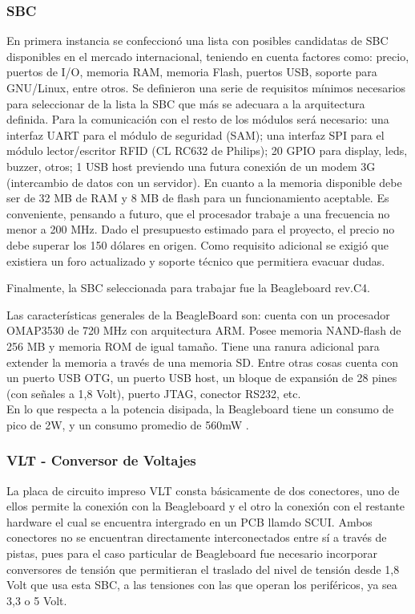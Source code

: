 \documentclass[%
        final,
        notitlepage,
        narroweqnarray,
        inline,
        ]{ieee}
\begin{document}
\subsubsection{SBC}
En primera instancia se confeccionó una lista con posibles candidatas de SBC disponibles
en el mercado internacional, teniendo en cuenta factores como: precio, puertos de I/O, memoria RAM, memoria Flash, puertos USB, soporte para GNU/Linux, entre otros.
Se definieron una serie de requisitos mínimos necesarios para seleccionar de la lista la SBC que más se adecuara a la arquitectura definida.
Para la comunicación con el resto de los módulos será necesario: una interfaz UART para el módulo de seguridad (SAM); una interfaz SPI para el módulo lector/escritor RFID (CL RC632 de Philips); 20 GPIO para display, leds, buzzer, otros; 1 USB host previendo una futura conexión de un modem 3G (intercambio de datos con un servidor). En cuanto a la memoria disponible debe ser de 32 MB de RAM y 8 MB de flash para un funcionamiento aceptable. Es conveniente, pensando a futuro, que el procesador trabaje a una frecuencia no menor a 200 MHz.
Dado el presupuesto estimado para el proyecto, el precio no debe superar los 150 dólares en origen.
Como requisito adicional se exigió que existiera un foro actualizado y soporte técnico que permitiera evacuar dudas.

Finalmente, la SBC seleccionada para trabajar fue la Beagleboard rev.C4.

Las características generales de la BeagleBoard son: cuenta con un procesador \\
OMAP3530 de 720 MHz con arquitectura ARM. Posee  memoria NAND-flash de 256 MB y memoria ROM de igual tamaño. Tiene una ranura adicional para extender la memoria a través de una memoria SD. Entre otras cosas cuenta con un puerto USB OTG, un puerto USB host, un bloque de expansión de 28 pines (con señales a 1,8 Volt), puerto JTAG, conector RS232, etc.\\
En lo que respecta a la potencia disipada, la Beagleboard tiene un consumo de pico de 2W, y un consumo promedio de 560mW \cite{consumo1} \cite{consumo2}.

\subsubsection{VLT - Conversor de Voltajes}
La placa de circuito impreso VLT consta básicamente de dos conectores, uno de ellos permite la conexión con la Beagleboard y el otro la conexión con el restante hardware el cual se encuentra intergrado en un PCB llamdo SCUI. Ambos conectores no se encuentran directamente interconectados entre sí a través de pistas, pues para el caso particular de Beagleboard fue necesario incorporar conversores de tensión que permitieran el traslado del nivel de tensión desde 1,8 Volt que usa esta SBC, a las tensiones con las que operan los periféricos, ya sea 3,3 o 5 Volt.
\end{document}
